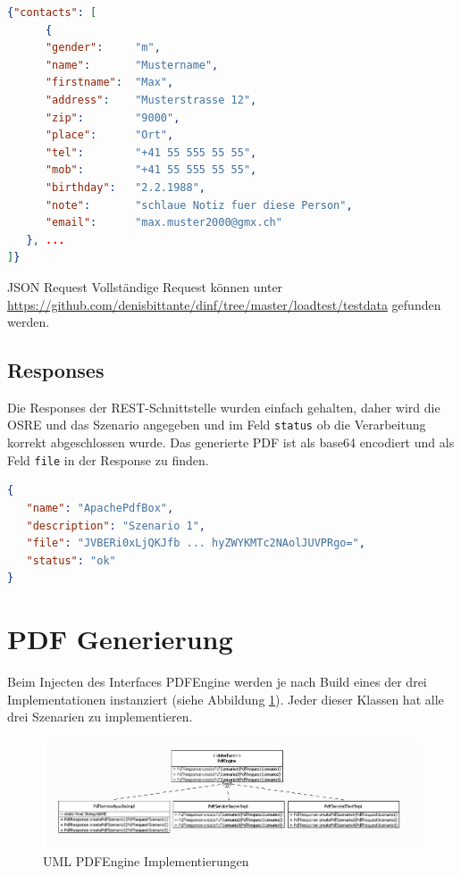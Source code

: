 \documentclass[main.tex]{subfiles}
\begin{document}
\begin{lstlisting}[language=json]
{"contacts": [
      {
      "gender":     "m",
      "name":       "Mustername",
      "firstname":  "Max",
      "address":    "Musterstrasse 12",
      "zip":        "9000",
      "place":      "Ort",
      "tel":        "+41 55 555 55 55",
      "mob":        "+41 55 555 55 55",
      "birthday":   "2.2.1988",
      "note":       "schlaue Notiz fuer diese Person",
      "email":      "max.muster2000@gmx.ch"
   }, ...
]}


\end{lstlisting}

\begin{reference}{JSON Request}
 Vollständige Request können unter \url{https://github.com/denisbittante/dinf/tree/master/loadtest/testdata} gefunden werden.
\end{reference}
 


\subsection{Responses}
Die Responses der REST-Schnittstelle wurden einfach gehalten, daher wird die OSRE und das Szenario angegeben und im Feld \texttt{status} ob die Verarbeitung korrekt abgeschlossen wurde. Das generierte PDF ist als base64 encodiert und als Feld \texttt{file} in der Response zu finden. 
\begin{lstlisting}[language=json]
{
   "name": "ApachePdfBox",
   "description": "Szenario 1",
   "file": "JVBERi0xLjQKJfb ... hyZWYKMTc2NAolJUVPRgo=",
   "status": "ok"
}

\end{lstlisting}




\section{PDF Generierung}

Beim Injecten des Interfaces PDFEngine werden je nach Build eines der drei Implementationen instanziert (siehe Abbildung \ref{figure:pdfEngineImpl}). Jeder dieser Klassen hat alle drei Szenarien zu implementieren.  


\begin{figure}[h]
 
\includegraphics[width=\textwidth ]{pic/uml/PdfEngineImplemntierung.jpg}
 \caption{UML PDFEngine Implementierungen}
 \label{figure:pdfEngineImpl}
\end{figure}
\end{document}
